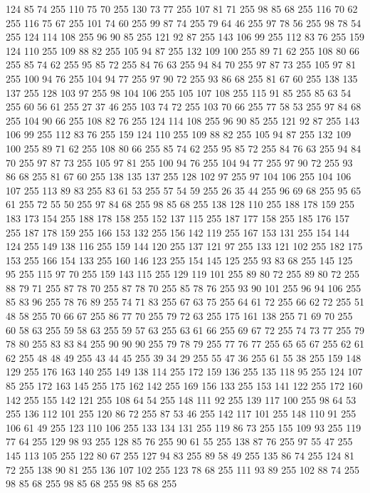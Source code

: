 124 85 74 255 110 75 70 255 130 73 77 255 107 81 71 255 98 85 68 255 116 70 62 255 116 75 67 255 101 74 60 255 99 87 74 255 79 64 46 255 97 78 56 255 98 78 54 255 124 114 108 255 96 90 85 255 121 92 87 255 143 106 99 255 112 83 76 255 159 124 110 255 109 88 82 255 105 94 87 255 132 109 100 255 89 71 62 255 108 80 66 255 85 74 62 255 95 85 72 255 84 76 63 255 94 84 70 255 97 87 73 255 105 97 81 255 100 94 76 255 104 94 77 255 97 90 72 255 93 86 68 255 81 67 60 255 138 135 137 255 128 103 97 255 98 104 106 255 105 107 108 255 115 91 85 255 85 63 54 255 60 56 61 255 27 37 46 255 103 74 72 255 103 70 66 255 77 58 53 255 97 84 68 255 104 90 66 255 108 82 76 255 124 114 108 255 96 90 85 255 121 92 87 255 143 106 99 255 112 83 76 255 159 124 110 255 109 88 82 255 105 94 87 255 132 109 100 255 89 71 62 255 108 80 66 255 85 74 62 255 95 85 72 255 84 76 63 255 94 84 70 255 97 87 73 255
105 97 81 255 100 94 76 255 104 94 77 255 97 90 72 255 93 86 68 255 81 67 60 255 138 135 137 255 128 102 97 255 97 104 106 255 104 106 107 255 113 89 83 255 83 61 53 255 57 54 59 255 26 35 44 255 96 69 68 255 95 65 61 255 72 55 50 255 97 84 68 255 98 85 68 255 138 128 110 255 188 178 159 255 183 173 154 255 188 178 158 255 152 137 115 255 187 177 158 255 185 176 157 255 187 178 159 255 166 153 132 255 156 142 119 255 167 153 131 255 154 144 124 255 149 138 116 255 159 144 120 255 137 121 97 255 133 121 102 255 182 175 153 255 166 154 133 255 160 146 123 255 154 145 125 255 93 83 68 255 145 125 95 255 115 97 70 255 159 143 115 255 129 119 101 255 89 80 72 255 89 80 72 255 88 79 71 255 87 78 70 255 87 78 70 255 85 78 76 255 93 90 101 255 96 94 106 255 85 83 96 255 78 76 89 255 74 71 83 255 67 63 75 255 64 61 72 255 66 62 72 255 51 48 58 255 70 66 67 255 86 77 70 255 79 72 63 255 175 161 138 255 71 69 70 255
60 58 63 255 59 58 63 255 59 57 63 255 63 61 66 255 69 67 72 255 74 73 77 255 79 78 80 255 83 83 84 255 90 90 90 255 79 78 79 255 77 76 77 255 65 65 67 255 62 61 62 255 48 48 49 255 43 44 45 255 39 34 29 255 55 47 36 255 61 55 38 255 159 148 129 255 176 163 140 255 149 138 114 255 172 159 136 255 135 118 95 255 124 107 85 255 172 163 145 255 175 162 142 255 169 156 133 255 153 141 122 255 172 160 142 255 155 142 121 255 108 64 54 255 148 111 92 255 139 117 100 255 98 64 53 255 136 112 101 255 120 86 72 255 87 53 46 255 142 117 101 255 148 110 91 255 106 61 49 255 123 110 106 255 133 134 131 255 119 86 73 255 155 109 93 255 119 77 64 255 129 98 93 255 128 85 76 255 90 61 55 255 138 87 76 255 97 55 47 255 145 113 105 255 122 80 67 255 127 94 83 255 89 58 49 255 135 86 74 255 124 81 72 255 138 90 81 255 136 107 102 255 123 78 68 255 111 93 89 255 102 88 74 255 98 85 68 255 98 85 68 255 98 85 68 255
